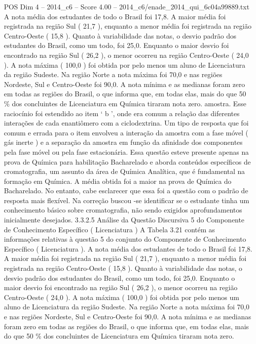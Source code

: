 \begin{textsample}{POS Dim 4 – 2014\_c6 – Score 4.00 – 2014\_c6/enade\_2014\_qui\_6c04a99889.txt}
A nota média dos estudantes de todo o Brasil foi 17,8.
A maior média foi registrada na região Sul ( 21,7 ), enquanto a menor média foi registrada na região Centro-Oeste ( 15,8 ).
Quanto à variabilidade das notas, o desvio padrão dos estudantes do Brasil, como um todo, foi 25,0.
Enquanto o maior desvio foi encontrado na região Sul ( 26,2 ), o menor ocorreu na região Centro-Oeste ( 24,0 ).
A nota máxima ( 100,0 ) foi obtida por pelo menos um aluno de Licenciatura da região Sudeste.
Na região Norte a nota máxima foi 70,0 e nas regiões Nordeste, Sul e Centro-Oeste foi 90,0.
A nota mínima e as medianas foram zero em todas as regiões do Brasil, o que informa que, em todas elas, mais do que 50 \% dos concluintes de Licenciatura em Química tiraram nota zero. amostra.
Esse raciocínio foi estendido ao item ‘ b ’, onde era comum a relação das diferentes interações de cada enantiômero com a ciclodextrina.
Um tipo de resposta que foi comum e errada para o item envolveu a interação da amostra com a fase móvel ( gás inerte ) e a separação da amostra em função da afinidade dos componentes pela fase móvel ou pela fase estacionária.
Essa questão esteve presente apenas na prova de Química para habilitação Bacharelado e aborda conteúdos específicos de cromatografia, um assunto da área de Química Analítica, que é fundamental na formação em Química.
A média obtida foi a maior na prova de Química do Bacharelado.
No entanto, cabe esclarecer que essa foi a questão com o padrão de resposta mais flexível.
Na correção buscou -se identificar se o estudante tinha um conhecimento básico sobre cromatografia, não sendo exigidos aprofundamentos inicialmente desejados. 3.3.2.5 Análise da Questão Discursiva 5 do Componente de Conhecimento Específico ( Licenciatura ) A Tabela 3.21 contém as informações relativas à questão 5 do conjunto do Componente de Conhecimento Específico ( Licenciatura ).
A nota média dos estudantes de todo o Brasil foi 17,8.
A maior média foi registrada na região Sul ( 21,7 ), enquanto a menor média foi registrada na região Centro-Oeste ( 15,8 ).
Quanto à variabilidade das notas, o desvio padrão dos estudantes do Brasil, como um todo, foi 25,0.
Enquanto o maior desvio foi encontrado na região Sul ( 26,2 ), o menor ocorreu na região Centro-Oeste ( 24,0 ).
A nota máxima ( 100,0 ) foi obtida por pelo menos um aluno de Licenciatura da região Sudeste.
Na região Norte a nota máxima foi 70,0 e nas regiões Nordeste, Sul e Centro-Oeste foi 90,0.
A nota mínima e as medianas foram zero em todas as regiões do Brasil, o que informa que, em todas elas, mais do que 50 \% dos concluintes de Licenciatura em Química tiraram nota zero.

\end{textsample}

